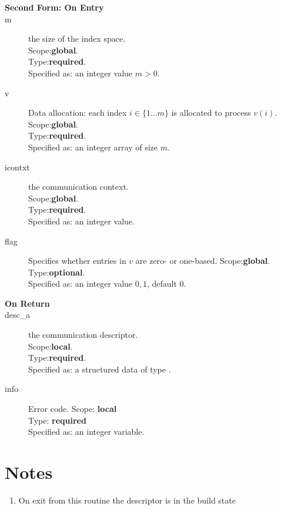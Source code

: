 \begin{description}
\item[\bf  Second Form: On Entry ]
\item[m] the size of the index space.\\
Scope:{\bf global}.\\
Type:{\bf required}.\\
Specified as: an integer value $m>0$.
\item[v] Data allocation: each index $i\in \{1\dots m\}$ is allocated
  to process $v(i)$.
Scope:{\bf global}.\\
Type:{\bf required}.\\
Specified as: an integer array of size $m$. 
\item[icontxt] the communication context.\\
Scope:{\bf global}.\\
Type:{\bf required}.\\
Specified as: an integer value.
\item[flag] Specifies whether entries in $v$ are zero- or one-based.
Scope:{\bf global}.\\
Type:{\bf optional}.\\
Specified as: an integer value $0,1$, default $0$.
\end{description}

\begin{description}
\item[\bf On Return]
\item[desc\_a] the communication descriptor.\\
Scope:{\bf local}.\\
Type:{\bf required}.\\
Specified as: a structured data of type \descdata.
\item[info] Error code.
Scope: {\bf local} \\
Type: {\bf required}\\
Specified as: an integer variable.\\
\end{description}

\section*{Notes}
\begin{enumerate}
\item On exit from this routine the descriptor is in the build state
\end{enumerate}


